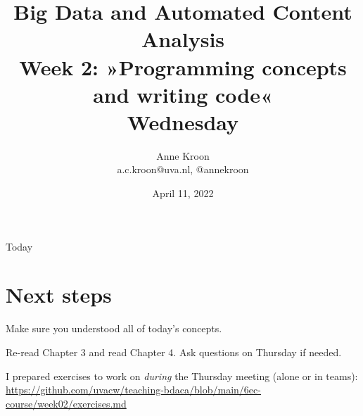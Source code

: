 

\graphicspath{{../../resources/img/}}




\title[Big Data and Automated Content Analysis]{\textbf{Big Data and Automated Content Analysis} 
\\Week 2: »Programming concepts and writing code«
\\Wednesday}
\author[Anne Kroon]{Anne Kroon\\ \footnotesize{a.c.kroon@uva.nl, @annekroon \\}}
\date{April 11, 2022}


\begin{frame}{}
	\titlepage
\end{frame}

\begin{frame}{Today}
	\tableofcontents
\end{frame}










\section{Next steps}




\begin{frame}[standout]
Make sure you understood all of today's concepts.

Re-read Chapter 3 and read Chapter 4. Ask questions on Thursday if needed.

I prepared exercises to work on \emph{during} the Thursday meeting (alone or in teams):
\large{\url{https://github.com/uvacw/teaching-bdaca/blob/main/6ec-course/week02/exercises.md}}
\end{frame}



\begin{frame}
	\printbibliography
\end{frame}



